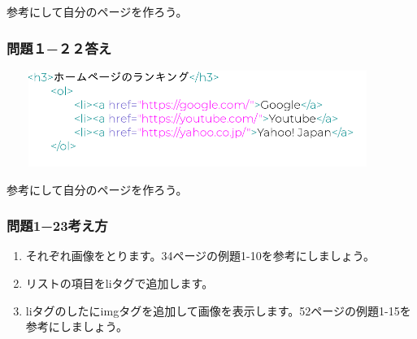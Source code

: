 \documentclass[a4paper,12pt]{jarticle}
\begin{document}
\bigskip

参考にして自分のページを作ろう。


\bigskip

\subsubsection{\bfseries
  問題１−２２答え}


\centering
\includegraphics[width=12.448cm,height=3.129cm]{textbook-img241.png}
\flushleft

\bigskip

\centering
{}
\flushleft

\bigskip
参考にして自分のページを作ろう。

\clearpage\subsubsection{\bfseries
  問題1−23考え方}

\begin{enumerate}
  \item
        それぞれ画像をとります。34ページの例題1-10を参考にしましょう。
  \item リストの項目をliタグで追加します。
  \item
        liタグのしたにimgタグを追加して画像を表示します。52ページの例題1-15を参考にしましょう。
\end{enumerate}
\centering
{}
\flushleft
\end{document}
